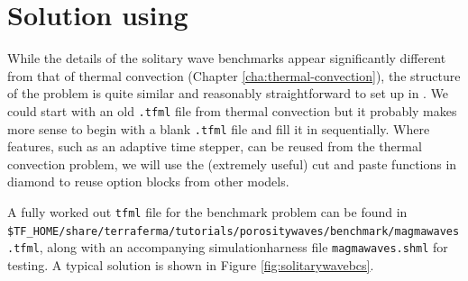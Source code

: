 \section{Solution using \TF}
\label{sec:solution-using-tf}

While the details of the solitary wave benchmarks appear significantly
different from that of thermal convection (Chapter
\ref{cha:thermal-convection}), the structure of the problem is quite
similar and reasonably straightforward to set up in \TF{}.  We could
start with an old \texttt{.tfml} file from thermal convection but it
probably makes more sense to begin with a blank \texttt{.tfml} file
and fill it in sequentially.  Where features, such as an adaptive time
stepper, can be reused from the thermal convection problem, we will
use the (extremely useful) cut and paste functions in diamond to reuse
option blocks from other models.

A fully worked out \texttt{tfml} file for the benchmark problem 
can be found in
\texttt{\$TF\_HOME/share/terraferma/tutorials/porositywaves/benchmark/magmawaves.tfml},
along with an accompanying simulationharness file \texttt{magmawaves.shml}
for testing.  A typical solution is shown in Figure \ref{fig:solitarywavebcs}.

